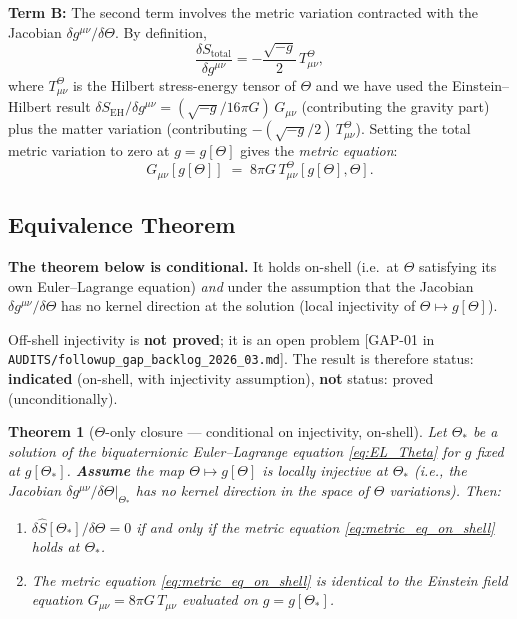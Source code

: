 \documentclass[12pt]{article}
\newtheorem{theorem}{Theorem}[section]
\theoremstyle{definition}
\theoremstyle{remark}
\begin{document}
\textbf{Term B:} The second term involves the metric variation contracted with the
Jacobian $\delta g^{\mu\nu}/\delta\Theta$.  By definition,
\begin{equation}
  \frac{\delta S_{\text{total}}}{\delta g^{\mu\nu}} = -\frac{\sqrt{-g}}{2}\,T^\Theta_{\mu\nu},
  \label{eq:metric_variation}
\end{equation}
where $T^\Theta_{\mu\nu}$ is the Hilbert stress-energy tensor of $\Theta$ and we have
used the Einstein--Hilbert result $\delta S_{\text{EH}}/\delta g^{\mu\nu}
= (\sqrt{-g}/16\pi G)\,G_{\mu\nu}$ (contributing the gravity part) plus the matter
variation (contributing $-(\sqrt{-g}/2)\,T^\Theta_{\mu\nu}$).  Setting the total metric
variation to zero at $g=g[\Theta]$ gives the \emph{metric equation}:
\begin{equation}
  G_{\mu\nu}[g[\Theta]] \;=\; 8\pi G\,T^\Theta_{\mu\nu}[g[\Theta],\Theta].
  \label{eq:metric_eq_on_shell}
\end{equation}

\subsection{Equivalence Theorem}

\begin{tcolorbox}[colback=orange!5!white,colframe=orange!75!black,
  title={Assumption Required: On-Shell Injectivity}]
\textbf{The theorem below is conditional.}
It holds on-shell (i.e.\ at $\Theta$ satisfying its own Euler--Lagrange equation)
\emph{and} under the assumption that the Jacobian $\delta g^{\mu\nu}/\delta\Theta$
has no kernel direction at the solution (local injectivity of $\Theta\mapsto g[\Theta]$).

\medskip
Off-shell injectivity is \textbf{not proved}; it is an open problem [GAP-01 in
\texttt{AUDITS/followup\_gap\_backlog\_2026\_03.md}].  The result is therefore
status: \textbf{indicated} (on-shell, with injectivity assumption), \textbf{not}
status: proved (unconditionally).
\end{tcolorbox}

\begin{theorem}[$\Theta$-only closure — conditional on injectivity, on-shell]
\label{thm:theta_only}
Let $\Theta_*$ be a solution of the biquaternionic Euler--Lagrange equation
\eqref{eq:EL_Theta} for $g$ fixed at $g[\Theta_*]$.
\textbf{Assume} the map $\Theta\mapsto g[\Theta]$ is locally injective at $\Theta_*$
(i.e., the Jacobian $\delta g^{\mu\nu}/\delta\Theta|_{\Theta_*}$ has no kernel
direction in the space of $\Theta$ variations).  Then:
\begin{enumerate}
  \item $\delta\hat{S}[\Theta_*]/\delta\Theta = 0$ if and only if the metric equation
        \eqref{eq:metric_eq_on_shell} holds at $\Theta_*$.
  \item The metric equation \eqref{eq:metric_eq_on_shell} is identical to the
        Einstein field equation $G_{\mu\nu}=8\pi G\,T_{\mu\nu}$ evaluated on
        $g=g[\Theta_*]$.
\end{enumerate}
\end{theorem}
\end{document}
